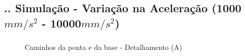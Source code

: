 \documentclass[aspectratio=169]{beamer}
\begin{document}
\subsection{\insertsectionnumber .\insertsubsectionnumber . Simulação - Variação na Aceleração (1000$mm/s^2$ - 10000$mm/s^2$)}

\begin{frame}
  \frametitle{\insertsubsection}
  \begin{figure}[H]
    \centering
    \caption{Caminhos da ponta e da base - Detalhamento (A)}
    \hfill
  \end{figure}
\end{frame}
\end{document}
